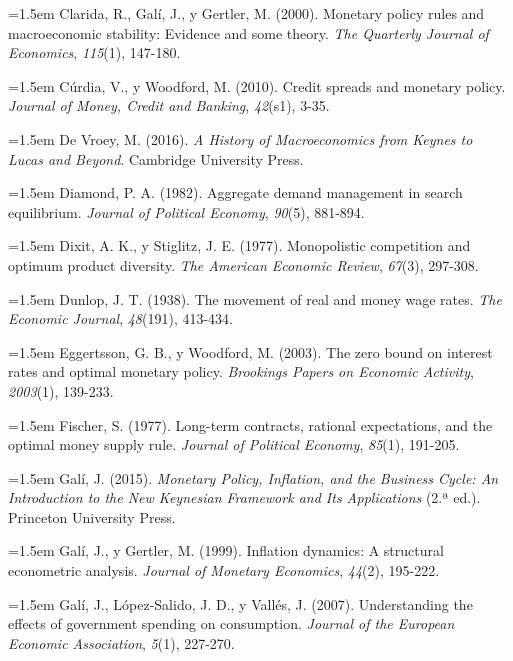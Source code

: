 \documentclass[10pt,a4paper]{article}
\begin{document}
\noindent\hangindent=1.5em Clarida, R., Galí, J., y Gertler, M. (2000). Monetary policy rules and macroeconomic stability: Evidence and some theory. \textit{The Quarterly Journal of Economics}, \textit{115}(1), 147-180.

\noindent\hangindent=1.5em Cúrdia, V., y Woodford, M. (2010). Credit spreads and monetary policy. \textit{Journal of Money, Credit and Banking}, \textit{42}(s1), 3-35.

\noindent\hangindent=1.5em De Vroey, M. (2016). \textit{A History of Macroeconomics from Keynes to Lucas and Beyond}. Cambridge University Press.

\noindent\hangindent=1.5em Diamond, P. A. (1982). Aggregate demand management in search equilibrium. \textit{Journal of Political Economy}, \textit{90}(5), 881-894.

\noindent\hangindent=1.5em Dixit, A. K., y Stiglitz, J. E. (1977). Monopolistic competition and optimum product diversity. \textit{The American Economic Review}, \textit{67}(3), 297-308.

\noindent\hangindent=1.5em Dunlop, J. T. (1938). The movement of real and money wage rates. \textit{The Economic Journal}, \textit{48}(191), 413-434.

\noindent\hangindent=1.5em Eggertsson, G. B., y Woodford, M. (2003). The zero bound on interest rates and optimal monetary policy. \textit{Brookings Papers on Economic Activity}, \textit{2003}(1), 139-233.

\noindent\hangindent=1.5em Fischer, S. (1977). Long-term contracts, rational expectations, and the optimal money supply rule. \textit{Journal of Political Economy}, \textit{85}(1), 191-205.

\noindent\hangindent=1.5em Galí, J. (2015). \textit{Monetary Policy, Inflation, and the Business Cycle: An Introduction to the New Keynesian Framework and Its Applications} (2.ª ed.). Princeton University Press.

\noindent\hangindent=1.5em Galí, J., y Gertler, M. (1999). Inflation dynamics: A structural econometric analysis. \textit{Journal of Monetary Economics}, \textit{44}(2), 195-222.

\noindent\hangindent=1.5em Galí, J., López-Salido, J. D., y Vallés, J. (2007). Understanding the effects of government spending on consumption. \textit{Journal of the European Economic Association}, \textit{5}(1), 227-270.
\end{document}
